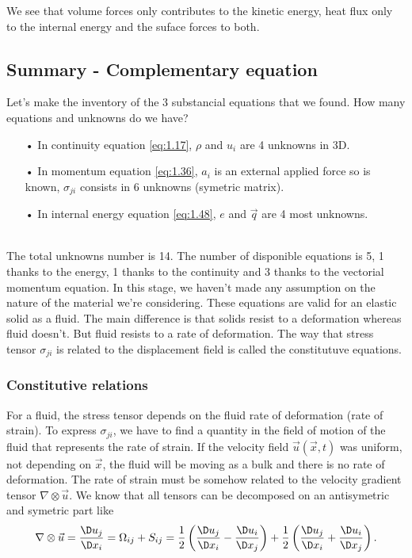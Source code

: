 		\begin{center}
		\end{center}
		We see that volume forces only contributes to the kinetic energy, heat flux only to the internal energy and the suface forces to both. 
		
	\subsection{Summary - Complementary equation}
		Let's make the inventory of the 3 substancial equations that we found. How many equations and unknowns do we have? 
	\begin{itemize}
		\item[•] In continuity equation \autoref{eq:1.17}, $\rho$ and $u_i$ are 4 unknowns in 3D. 
		\item[•] In momentum equation \autoref{eq:1.36}, $a_i$ is an external applied force so is known, $\sigma _{ji}$ consists in 6 unknowns (symetric matrix).
		\item[•] In internal energy equation \autoref{eq:1.48}, $e$ and $\vec{q}$ are 4 most unknowns. 
	\end{itemize}			
	\ \\
	The total unknowns number is 14.  The number of disponible equations is 5, 1 thanks to the energy, 1 thanks to the continuity and 3 thanks to the vectorial momentum equation. In this stage, we haven't made any assumption on the nature of the material we're considering. These equations are valid for an elastic solid as a fluid. The main difference is that solids resist to a deformation whereas fluid doesn't. But fluid resists to a rate of deformation. The way that stress tensor $\sigma _{ji}$ is related to the displacement field is called the constitutuve equations. 
	
	\subsubsection{Constitutive relations} 
		For a fluid, the stress tensor depends on the fluid rate of deformation (rate of strain). To express $\sigma _{ji}$, we have to find a quantity in the field of motion of the fluid that represents the rate of strain. If the velocity field $\vec{u}(\vec{x},t)$ was uniform, not depending on $\vec{x}$, the fluid will be moving as a bulk and there is no rate of deformation. The rate of strain must be somehow related to the velocity gradient tensor $\nabla \otimes \vec{u}$. We know that all tensors can be decomposed on an antisymetric and symetric part like 
		\begin{equation}
			\nabla \otimes \vec{u} = \frac{\D u_j}{\D x_i} = \Omega _{ij} + S _{ij} = \frac{1}{2} \left( \frac{\D u_j}{\D x_i} - \frac{\D u_i}{\D x_j} \right) + \frac{1}{2} \left( \frac{\D u_j}{\D x_i} + \frac{\D u_i}{\D x_j} \right).
		\end{equation}
		
